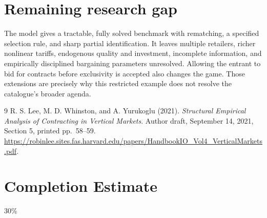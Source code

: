 \documentclass[11pt]{article}
\theoremstyle{remark}
\begin{document}
\section{Remaining research gap}
The model gives a tractable, fully solved benchmark with rematching,
a specified selection rule, and sharp partial identification. It leaves
multiple retailers, richer nonlinear tariffs, endogenous quality and
investment, incomplete information, and empirically disciplined
bargaining parameters unresolved. Allowing the entrant to bid for
contracts before exclusivity is accepted also changes the game.
Those extensions are precisely why this restricted example does not
resolve the catalogue's broader agenda.
\begin{thebibliography}{9}
 R. S. Lee, M. D. Whinston, and A. Yurukoglu (2021).
\emph{Structural Empirical Analysis of Contracting in Vertical Markets}.
Author draft, September 14, 2021, Section 5, printed pp.~58--59.
\url{https://robinlee.sites.fas.harvard.edu/papers/HandbookIO_Vol4_VerticalMarkets.pdf}.
\end{thebibliography}

\section{Completion Estimate}
30\%
\end{document}

